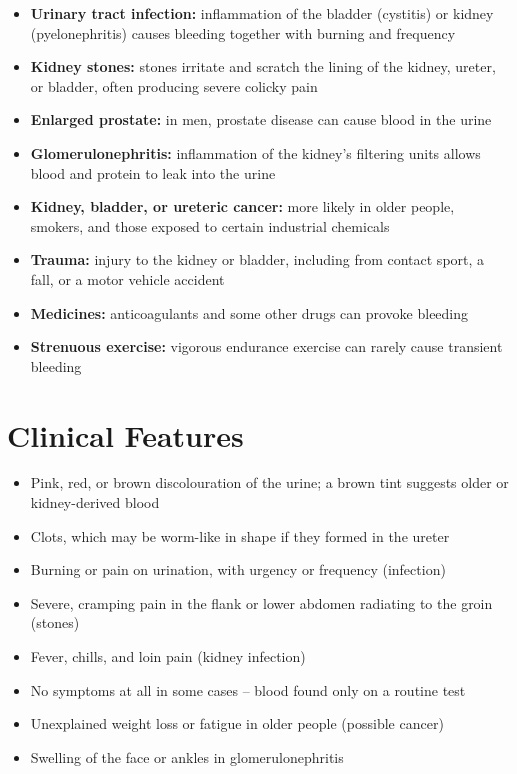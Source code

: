 \begin{itemize}
    \item \textbf{Urinary tract infection:} inflammation of the bladder (cystitis) or kidney (pyelonephritis) causes bleeding together with burning and frequency
    \item \textbf{Kidney stones:} stones irritate and scratch the lining of the kidney, ureter, or bladder, often producing severe colicky pain
    \item \textbf{Enlarged prostate:} in men, prostate disease can cause blood in the urine
    \item \textbf{Glomerulonephritis:} inflammation of the kidney's filtering units allows blood and protein to leak into the urine
    \item \textbf{Kidney, bladder, or ureteric cancer:} more likely in older people, smokers, and those exposed to certain industrial chemicals
    \item \textbf{Trauma:} injury to the kidney or bladder, including from contact sport, a fall, or a motor vehicle accident
    \item \textbf{Medicines:} anticoagulants and some other drugs can provoke bleeding
    \item \textbf{Strenuous exercise:} vigorous endurance exercise can rarely cause transient bleeding
\end{itemize}

\section*{Clinical Features}
\begin{itemize}
    \item Pink, red, or brown discolouration of the urine; a brown tint suggests older or kidney-derived blood
    \item Clots, which may be worm-like in shape if they formed in the ureter
    \item Burning or pain on urination, with urgency or frequency (infection)
    \item Severe, cramping pain in the flank or lower abdomen radiating to the groin (stones)
    \item Fever, chills, and loin pain (kidney infection)
    \item No symptoms at all in some cases -- blood found only on a routine test
    \item Unexplained weight loss or fatigue in older people (possible cancer)
    \item Swelling of the face or ankles in glomerulonephritis
\end{itemize}

